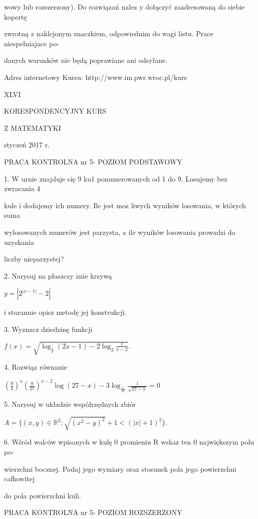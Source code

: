 \documentclass[a4paper,12pt]{article}
\begin{document}
wowy lub rozszerzony). Do rozwiązań nalez $\mathrm{y}$ dołączyč zaadresowaną do siebie kopertę

zwrotną $\mathrm{z}$ naklejonym znaczkiem, odpowiednim do wagi listu. Prace niespełniajace po-

danych warunków nie będą poprawiane ani odsyłane.

Adres internetowy Kursu: http://www.im.pwr.wroc.pl/kurs







XLVI

KORESPONDENCYJNY KURS

Z MATEMATYKI

styczeń 2017 r.

PRACA KONTROLNA nr 5- POZIOM PODSTAWOWY

1. $\mathrm{W}$ urnie znajduje się 9 ku1 ponumerowanych od 1 do 9. Losujemy bez zwracania 4

kule $\mathrm{i}$ dodajemy ich numery. Ile jest $\mathrm{m}\mathrm{o}\dot{\mathrm{z}}$ liwych wyników losowania, $\mathrm{w}$ których suma

wylosowanych numerów jest parzysta, a ile wyników losowania prowadzi do uzyskania

liczby nieparzystej?

2. Narysuj na płaszczy $\acute{\mathrm{z}}\mathrm{n}\mathrm{i}\mathrm{e}$ krzywą

$y=|2^{|x-1|}-2|$

i starannie opisz metodę jej konstrukcji.

3. Wyznacz dziedzinę funkcji

$f(x)=\sqrt{\log_{\frac{1}{2}}(2x-1)-2\log_{2}\frac{1}{x-2}}.$

4. Rozwiąz równanie

$(\displaystyle \frac{9}{4})^{x}(\frac{8}{27})^{x-2}\log(27-x)-3\log_{\frac{1}{10}}\frac{1}{\sqrt{27-x}}=0$

5. Narysuj w układzie współrzędnych zbiór

$A=\{(x,y)\in \mathbb{R}^{2}:\sqrt{(x^{2}-y)^{2}}+1<(|x|+1)^{2}\}.$

6. Wśród walców wpisanych w kulę 0 promieniu R wskaz ten 0 największym polu po-

wierzchni bocznej. Podaj jego wymiary oraz stosunek pola jego powierzchni cafkowitej

do pola powierzchni kuli.




PRACA KONTROLNA nr 5- POZIOM ROZSZERZONY
\end{document}
